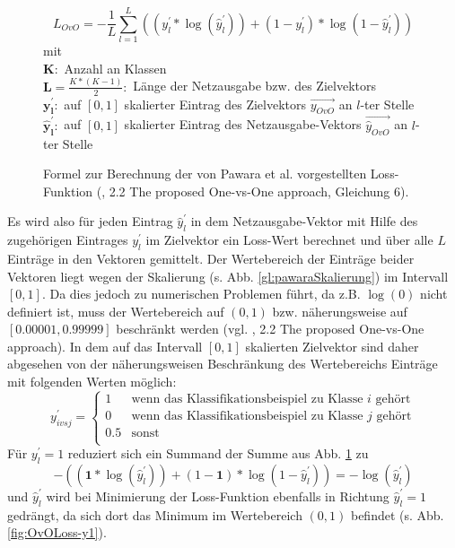 \begin{figure}[H]
\[L_{OvO} = - \frac{1}{L} \sum_{l=1}^{L}((y_{l}^{'} * \log{(\widehat{y}_{l}^{'})}) + (1 - y_{l}^{'}) * \log{(1-\widehat{y}_{l}^{'})})\]
mit\\
$\boldsymbol{K}:$ Anzahl an Klassen\\

$\boldsymbol{L}=\frac{K*(K-1)}{2}:$ Länge der Netzausgabe bzw. des Zielvektors\\

$\boldsymbol{y_{l}^{'}}:$ auf $[0, 1]$ skalierter Eintrag des Zielvektors $\overrightarrow{y_{OvO}}$ an $l$-ter Stelle\\

$\boldsymbol{\widehat{y}_{l}^{'}}:$ auf $[0, 1]$ skalierter Eintrag des Netzausgabe-Vektors $\overrightarrow{\widehat{y}_{OvO}}$ an $l$-ter Stelle\\


\caption{Formel zur Berechnung der von Pawara et al. vorgestellten Loss-Funktion (\cite{pawaraPaper}, 2.2 The proposed One-vs-One approach, Gleichung 6).}
\label{gl:pawaraLoss}
\end{figure}
Es wird also für jeden Eintrag $\widehat{y}_{l}^{'}$ in dem Netzausgabe-Vektor mit Hilfe des zugehörigen Eintrages $y_{l}^{'}$ im Zielvektor ein Loss-Wert berechnet und über alle $L$ Einträge in den Vektoren gemittelt. Der Wertebereich der Einträge beider Vektoren liegt wegen der Skalierung (s. Abb. \ref{gl:pawaraSkalierung}) im Intervall $[0,1]$. Da dies jedoch zu numerischen Problemen führt, da z.B. $\log{(0)}$ nicht definiert ist, muss der Wertebereich auf $(0, 1)$ bzw. näherungsweise auf $[0.00001, 0.99999]$ beschränkt werden (vgl. \cite{pawaraPaper}, 2.2 The proposed One-vs-One approach).
In dem auf das Intervall $[0, 1]$ skalierten Zielvektor sind daher abgesehen von der näherungsweisen Beschränkung des Wertebereichs Einträge mit folgenden Werten möglich:
\[
y_{ivsj}^{'}=
\begin{cases}
1 & \text{wenn das Klassifikationsbeispiel zu Klasse } i \text{ gehört}\\
0 & \text{wenn das Klassifikationsbeispiel zu Klasse } j \text{ gehört}\\
0.5 & \text{sonst}\\
\end{cases}
\]
Für $y_{l}^{'} = 1$ reduziert sich ein Summand der Summe aus Abb. \ref{gl:pawaraLoss} zu
\[-((\boldsymbol{1} * \log{(\widehat{y}_{l}^{'})}) + (1 - \boldsymbol{1}) * \log{(1-\widehat{y}_{l}^{'})}) = -\log{(\widehat{y}_{l}^{'})}\]
und $\widehat{y}_{l}^{'}$ wird bei Minimierung der Loss-Funktion ebenfalls in Richtung $\widehat{y}_{l}^{'}=1$ gedrängt, da sich dort das Minimum im Wertebereich $(0, 1)$ befindet (s. Abb. \ref{fig:OvOLoss-y1}).

